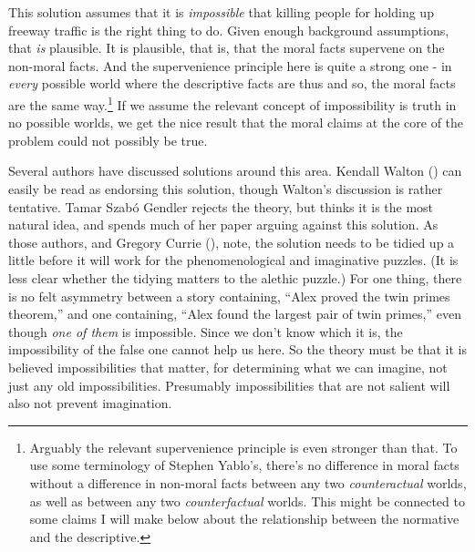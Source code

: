 \documentclass[
  10pt,
  letterpaper,
  DIV=11,
  numbers=noendperiod,
  twoside]{scrartcl}
\begin{document}
This solution assumes that it is \emph{impossible} that killing people
for holding up freeway traffic is the right thing to do. Given enough
background assumptions, that \emph{is} plausible. It is plausible, that
is, that the moral facts supervene on the non-moral facts. And the
supervenience principle here is quite a strong one - in \emph{every}
possible world where the descriptive facts are thus and so, the moral
facts are the same way.\footnote{Arguably the relevant supervenience
  principle is even stronger than that. To use some terminology of
  Stephen Yablo's, there's no difference in moral facts without a
  difference in non-moral facts between any two \emph{counteractual}
  worlds, as well as between any two \emph{counterfactual} worlds. This
  might be connected to some claims I will make below about the
  relationship between the normative and the descriptive.} If we assume
the relevant concept of impossibility is truth in no possible worlds, we
get the nice result that the moral claims at the core of the problem
could not possibly be true.

Several authors have discussed solutions around this area. Kendall
Walton () can easily be read as endorsing
this solution, though Walton's discussion is rather tentative. Tamar
Szabó Gendler rejects the theory, but thinks it is the most natural
idea, and spends much of her paper arguing against this solution. As
those authors, and Gregory Currie (),
note, the solution needs to be tidied up a little before it will work
for the phenomenological and imaginative puzzles. (It is less clear
whether the tidying matters to the alethic puzzle.) For one thing, there
is no felt asymmetry between a story containing, ``Alex proved the twin
primes theorem,'' and one containing, ``Alex found the largest pair of
twin primes,'' even though \emph{one of them} is impossible. Since we
don't know which it is, the impossibility of the false one cannot help
us here. So the theory must be that it is believed impossibilities that
matter, for determining what we can imagine, not just any old
impossibilities. Presumably impossibilities that are not salient will
also not prevent imagination.
\end{document}

